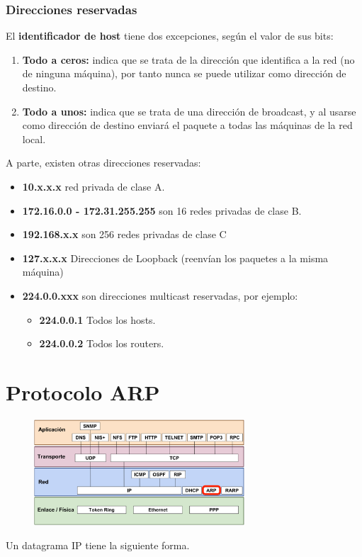 \subsubsection{Direcciones reservadas}
El \textbf{identificador de host} tiene dos excepciones, según el valor de sus bits:
\begin{enumerate}
    \item \textbf{Todo a ceros:} indica que se trata de la dirección que identifica a la red (no de ninguna máquina), por tanto nunca se puede utilizar como dirección de destino.
    \item \textbf{Todo a unos:} indica que se trata de una dirección de broadcast, y al usarse como dirección de destino enviará el paquete a todas las máquinas de la red local.
\end{enumerate}
A parte, existen otras direcciones reservadas:
\begin{itemize}
  \item \textbf{10.x.x.x} red privada de clase A.
  \item \textbf{172.16.0.0 - 172.31.255.255} son 16 redes privadas de clase B.
  \item \textbf{192.168.x.x} son 256 redes privadas de clase C
  \item \textbf{127.x.x.x} Direcciones de Loopback (reenvían los paquetes a la misma máquina)
  \item \textbf{224.0.0.xxx} son direcciones multicast reservadas, por ejemplo:
  \begin{itemize}
      \item \textbf{224.0.0.1} Todos los hosts.
      \item \textbf{224.0.0.2} Todos los routers.
  \end{itemize}
\end{itemize}

\section{Protocolo ARP}
\begin{figure}[H]
    \centering
    \includegraphics[width=0.7\textwidth]{img/ARP.png}
\end{figure}
\vspace{2cm}
Un datagrama IP tiene la siguiente forma.

